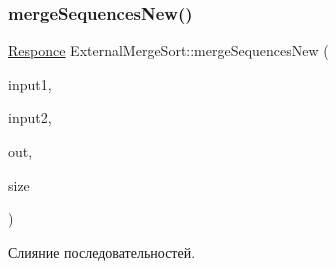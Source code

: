 \subsubsection{\texorpdfstring{merge\+Sequences\+New()}{mergeSequencesNew()}}
{\footnotesize\ttfamily \hyperlink{_structures_8h_a9864d6ef28dd6e38416afac4426b3491}{Responce} External\+Merge\+Sort\+::merge\+Sequences\+New (\begin{DoxyParamCaption}\item[{\hyperlink{class_file_manager}{File\+Manager} $\ast$}]{input1,  }\item[{\hyperlink{class_file_manager}{File\+Manager} $\ast$}]{input2,  }\item[{\hyperlink{class_file_manager}{File\+Manager} $\ast$}]{out,  }\item[{long long}]{size }\end{DoxyParamCaption})\hspace{0.3cm}{\ttfamily [private]}}



Слияние последовательностей. 


